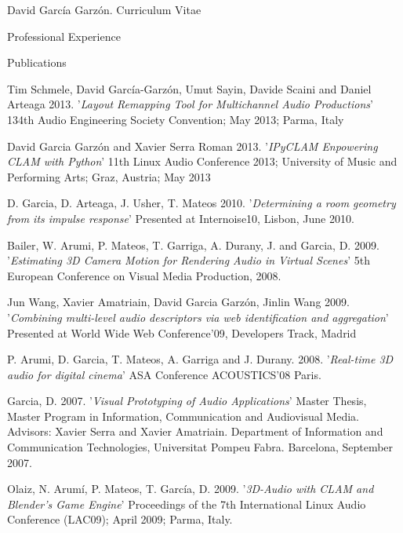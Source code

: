 \documentclass{article}
\begin{document}
\begin{cv}{David García Garzón. Curriculum Vitae}
\begin{cvlist}{Professional Experience}
\end{cvlist}

\begin{cvlist}{Publications}

\item[] {\sc Tim Schmele, David García-Garzón, Umut Sayin, Davide Scaini and Daniel Arteaga} 2013.
'{\em Layout Remapping Tool for Multichannel Audio Productions}'
134th Audio Engineering Society Convention; May 2013; Parma, Italy

\item[] {\sc David Garcia Garzón and Xavier Serra Roman} 2013.
'{\em IPyCLAM Enpowering CLAM with Python}'
11th Linux Audio Conference 2013; University of Music and Performing Arts; Graz, Austria; May 2013

\item[] {\sc D. Garcia, D. Arteaga,  J.  Usher, T. Mateos} 2010.
'{\em Determining a room geometry from its impulse response}'
Presented at Internoise10, Lisbon, June 2010.

\item[] {\sc Bailer, W. Arumi, P. Mateos, T. Garriga, A. Durany, J. and Garcia, D.} 2009.
'{\em Estimating 3D Camera Motion for Rendering Audio in Virtual Scenes}'
5th European Conference on Visual Media Production, 2008.

\item[] {\sc Jun Wang, Xavier Amatriain, David Garcia Garzón, Jinlin Wang} 2009.
'{\em Combining multi-level audio descriptors via web identification and aggregation}'
Presented at World Wide Web Conference'09, Developers Track, Madrid

\item[] {\sc P. Arumi, D. Garcia, T. Mateos, A. Garriga and J. Durany.} 2008.
'{\em Real-time 3D audio for digital cinema}'
ASA Conference ACOUSTICS'08 Paris.

\item[] {\sc Garcia, D.} 2007.
'{\em Visual Prototyping of Audio Applications}'
Master Thesis, Master Program in Information, Communication and Audiovisual Media. Advisors: Xavier Serra and Xavier Amatriain. Department of Information and Communication Technologies, Universitat Pompeu Fabra. Barcelona, September 2007.

\item[] {\sc Olaiz, N. Arumí, P. Mateos, T. García, D.} 2009.
'{\em 3D-Audio with CLAM and Blender's Game Engine}'
Proceedings of the 7th International Linux Audio Conference (LAC09); April 2009; Parma, Italy.


\end{cvlist}
\end{cv}
\end{document}
